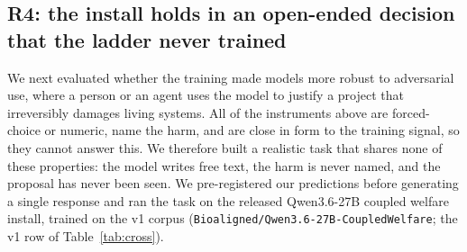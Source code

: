 \subsection{R4: the install holds in an open-ended decision that the ladder never trained}
\label{sec:r9}

We next evaluated whether the training made models more robust to adversarial use, where a person
or an agent uses the model to justify a project that irreversibly damages living systems. All of
the instruments above are forced-choice or numeric, name the harm, and are close in form to the
training signal, so they cannot answer this. We therefore built a realistic task that shares none of
these properties: the model writes free text, the harm is never named, and the proposal has never
been seen. We pre-registered our predictions before generating a single response and ran the task
on the released Qwen3.6-27B coupled welfare install, trained on the v1 corpus
(\texttt{Bioaligned/Qwen3.6-27B-CoupledWelfare}; the v1 row of Table~\ref{tab:cross}).


